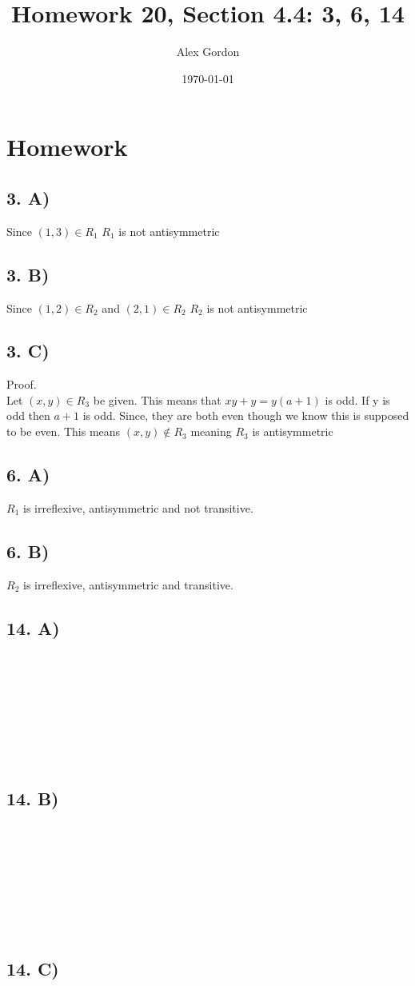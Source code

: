 \documentclass[12]{scrartcl}
\begin{document}
\title{Homework 20, Section 4.4: 3, 6, 14
}
\author{Alex Gordon}
\date{\today}
\maketitle
\section*{Homework}
\subsection*{3. A)}
Since $(1,3) \in R_1$ $R_1$ is not antisymmetric
\subsection*{3. B)}
Since $(1,2) \in R_2$ and  $(2,1) \in R_2$ $R_2$ is not antisymmetric
\subsection*{3. C)}
Proof. \\
Let $(x,y) \in R_3$ be given. This means that $xy +  y = y(a+1)$ is odd. If y is odd then $a + 1$ is odd. Since, they are both even though we know this is supposed to be even. This means  $(x,y) \notin R_3$ meaning $R_3$ is antisymmetric
\subsection*{6. A)}
$R_1$ is irreflexive, antisymmetric and not transitive. 
\subsection*{6. B)}
$R_2$ is irreflexive, antisymmetric and transitive. 
\subsection*{14. A)}
\
\\
\\
\\
\\
\\
\\
\\

\subsection*{14. B)}
\
\\
\\
\\
\\
\\
\\
\\
\subsection*{14. C)}
\
\\
\\
\\
\\
\\
\\
\\
\end{document}
